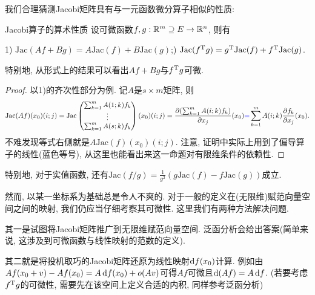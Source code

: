 我们合理猜测Jacobi矩阵具有与一元函数微分算子相似的性质: 

\begin{proposition}{Jacobi算子的算术性质}
	设可微函数$f,g:\mathbb{R} ^m \supseteq E \to \mathbb{R} ^n$, 则有
	\begin{center}
		1) $\mathrm{Jac}(Af+Bg)=A\mathrm{Jac}(f)+B\mathrm{Jac}(g)$;) $\mathrm{Jac}(f^{\operatorname{T}}g) = g^{\operatorname{T}}\mathrm{Jac}(f) + f^{\operatorname{T}}\mathrm{Jac}(g)$. 
	\end{center}
	特别地, 从形式上的结果可以看出$Af+Bg$与$f^{\operatorname{T}}g$可微. 
\end{proposition}
\begin{proof}
	以1)的齐次性部分为例. 记$A$是$s \times m$矩阵, 则$$\mathrm{Jac}(Af)(x_0)(i;j) = \mathrm{Jac}\begin{pmatrix}
		\sum_{k=1}^{m} A(1;k)f_k \\ \vdots \\ \sum_{k=1}^{m} A(s;k)f_k
	\end{pmatrix}(x_0)(i;j) = \frac{\partial (\sum_{k=1}^{m} A(i;k)f_k)}{\partial x_j}(x_0) {\color{blue}=} \sum_{k=1}^{m}A(i;k) \frac{\partial f_k}{\partial x_j}(x_0).$$
	不难发现等式右侧就是$A\mathrm{Jac}(f)(x_0)(i;j)$. 注意, 证明中实际上用到了偏导算子的线性(蓝色等号), 从这里也能看出来这一命题对有限维条件的依赖性. 
\end{proof}

特别地, 对于实值函数, 还有$\mathrm{Jac}(f/g) = \frac{1}{g^2} (g\mathrm{Jac}(f)-f\mathrm{Jac}(g))$成立. 

然而, 以某一坐标系为基础总是令人不爽的. 对于一般的定义在(无限维)赋范向量空间之间的映射, 我们仍应当仔细考察其可微性. 这里我们有两种方法解决问题. 

其一是试图将Jacobi矩阵推广到无限维赋范向量空间. 泛函分析会给出答案(简单来说, 这涉及到可微函数与线性映射的范数的定义). 

其二就是将投机取巧的Jacobi矩阵还原为线性映射$\mathop{}\!\mathrm{d} f(x_0)$计算. 例如由$Af(x_0+v)-Af(x_0) = A\mathop{}\!\mathrm{d} f(x_0) + o(Av)$可得$Af$可微且$\mathop{}\!\mathrm{d} (Af) = A\mathop{}\!\mathrm{d} f$. (若要考虑$f^{\operatorname{T}}g$的可微性, 需要先在该空间上定义合适的内积, 同样参考泛函分析)


